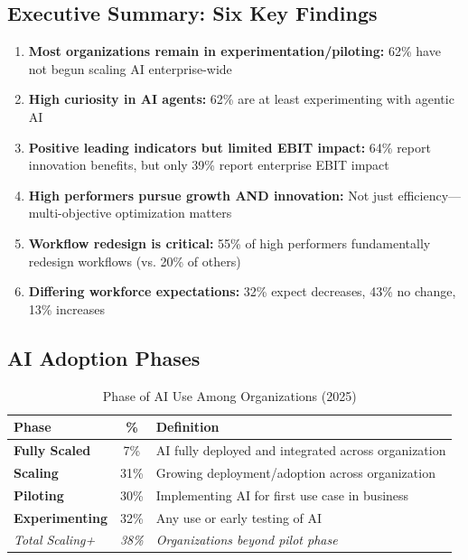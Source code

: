 \subsection{Executive Summary: Six Key Findings}

\begin{enumerate}
\item \textbf{Most organizations remain in experimentation/piloting:} 62\% have not begun scaling AI enterprise-wide
\item \textbf{High curiosity in AI agents:} 62\% are at least experimenting with agentic AI
\item \textbf{Positive leading indicators but limited EBIT impact:} 64\% report innovation benefits, but only 39\% report enterprise EBIT impact
\item \textbf{High performers pursue growth AND innovation:} Not just efficiency---multi-objective optimization matters
\item \textbf{Workflow redesign is critical:} 55\% of high performers fundamentally redesign workflows (vs. 20\% of others)
\item \textbf{Differing workforce expectations:} 32\% expect decreases, 43\% no change, 13\% increases
\end{enumerate}


\subsection{AI Adoption Phases}
\label{sec:vvv1-adoption}

\begin{table}[htbp]
\centering
\caption{Phase of AI Use Among Organizations (2025)}
\label{tab:vvv1-phases}
\renewcommand{\arraystretch}{1.3}
\begin{tabular}{@{}lcp{6cm}@{}}
\toprule
\textbf{Phase} & \textbf{\%} & \textbf{Definition} \\
\midrule
\textbf{Fully Scaled} & 7\% & AI fully deployed and integrated across organization \\
\textbf{Scaling} & 31\% & Growing deployment/adoption across organization \\
\textbf{Piloting} & 30\% & Implementing AI for first use case in business \\
\textbf{Experimenting} & 32\% & Any use or early testing of AI \\
\midrule
\textit{Total Scaling+} & \textit{38\%} & \textit{Organizations beyond pilot phase} \\
\bottomrule
\end{tabular}
\end{table}

